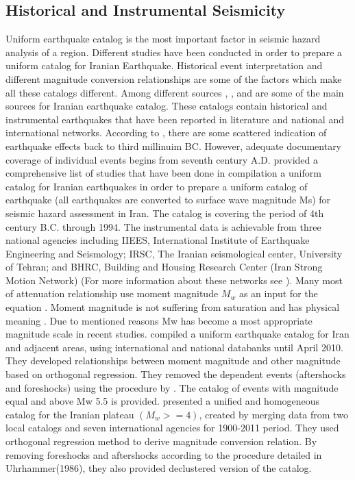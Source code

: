 \subsection{Historical  and Instrumental Seismicity}
Uniform earthquake catalog is the most important factor in seismic hazard analysis of a region.  Different studies have been conducted in order to prepare a uniform catalog for Iranian Earthquake. Historical event interpretation and different magnitude conversion relationships are some of the factors which make all these catalogs different. Among different sources \citet{Ambraseys2005}, \citet{Berberian1994}, and \citet{moinfar1994} are some of the main sources for Iranian earthquake catalog. These catalogs contain historical and instrumental earthquakes that have been reported in literature and national and international networks. According to \citet{Ambraseys2005}, there are some scattered indication of earthquake effects  back to third millinuim BC. However, adequate documentary coverage of individual events begins from seventh century A.D. \citet{Mirzaei1997} provided a comprehensive list of studies that have been done in compilation a uniform catalog for Iranian earthquakes in order to prepare a uniform catalog of earthquake (all earthquakes are converted to surface wave magnitude Ms) for seismic hazard assessment in Iran. The catalog is covering the period of 4th century B.C. through 1994. The instrumental data is achievable from three national agencies including IIEES, International Institute of Earthquake Engineering and Seismology; IRSC, The Iranian seismological center, University of Tehran; and BHRC, Building and Housing Research Center (Iran Strong Motion Network) (For more information about these networks see \citet{Karimiparidari2013}).
Many most of attenuation relationship use  moment magnitude $M_w$ as an input for the equation \citep{Douglas2011}. Moment magnitude is not suffering from saturation and has physical meaning \citep{Kanamori1977}. Due to mentioned reasons Mw has become a most appropriate magnitude scale in recent studies. 
 \citet{Karimiparidari2013}compiled a uniform earthquake catalog for Iran and adjacent areas, using international and national databanks until April 2010.  They developed relationships between moment magnitude and other magnitude based on orthogonal regression.  They removed the dependent events (aftershocks and foreshocks) using the procedure by \citet{Gardner1974}. The catalog of events with magnitude equal and above Mw 5.5 is provided. 
\citet{Shahvar2013} presented a unified and homogeneous catalog for the Iranian plateau $(M_w >= 4)$, created by merging data from two local catalogs and seven international agencies for 1900-2011 period. They used orthogonal regression method \citep{Castellaro2006} to derive magnitude conversion relation. By removing foreshocks and aftershocks according to the procedure detailed in Uhrhammer(1986), they also provided declustered version of the catalog.

